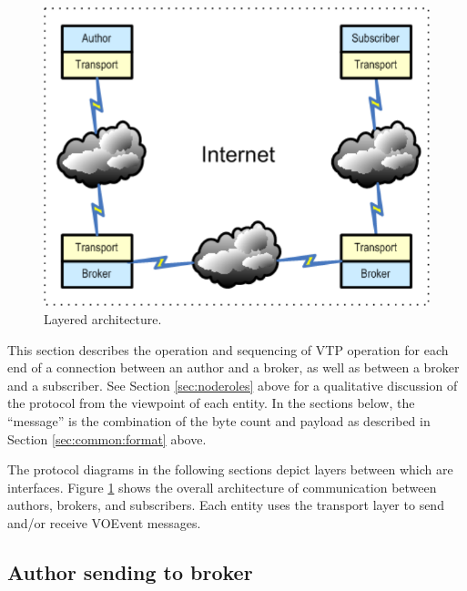 \documentclass[a4paper,11pt]{ivoa}
\begin{document}
\begin{figure}
  \begin{center}
  \includegraphics{figures/architecture.pdf}
  \end{center}

  \caption{Layered architecture.}

  \label{fig:architecture}
\end{figure}

This section describes the operation and sequencing of VTP operation for each
end of a connection between an author and a broker, as well as between a
broker and a subscriber. See Section \ref{sec:noderoles} above for a
qualitative discussion of the protocol from the viewpoint of each entity. In
the sections below, the ``message'' is the combination of the byte count and
payload as described in Section \ref{sec:common:format} above.

The protocol diagrams in the following sections depict layers between which
are interfaces. Figure \ref{fig:architecture} shows the overall architecture
of communication between authors, brokers, and subscribers. Each entity uses
the transport layer to send and/or receive VOEvent messages.

\subsection{Author sending to broker}
\end{document}
